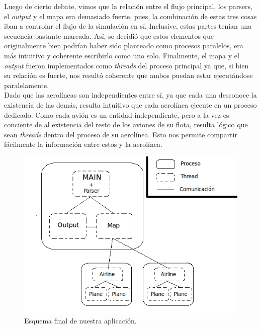 \documentclass[a4paper,10pt]{article}
\begin{document}
 Luego de cierto debate, vimos que la relación entre el flujo principal, los parsers, el \textit{output} y el mapa era demasiado fuerte, pues, 
 la combinación de estas tres cosas iban a controlar el flujo de la simulación en sí. Inclusive, estas partes tenían una secuencia bastante marcada. Así, se 
decidió que estos elementos que originalmente bien podrían haber sido planteado como procesos paralelos, era más intuitivo y coherente escribirlo como uno solo.
 Finalmente, el mapa y el \textit{output} fueron implementados como \textit{threads} del proceso principal ya que, si bien su relación es fuerte, nos resultó 
coherente que ambos puedan estar ejecutándose paralelamente.\\

Dado que las aerolíneas son independientes entre sí, ya que cada una desconoce la existencia de las demás, resulta intuitivo que cada aerolínea ejecute en un 
proceso dedicado. Como cada avión es un entidad independiente, pero a la vez es conciente de al existencia del resto de los aviones de su flota, resulta lógico 
que sean \textit{threads} dentro del proceso de su aerolínea. Esto nos permite compartir fácilmente la información entre estos y la aerolínea.

\begin{figure}[H]
\begin{center}
 \includegraphics[scale=0.6]{./images/Diagrama_simulacion_1.png}
 \caption{Esquema final de nuestra aplicación.}
\end{center}
\end{figure}
\end{document}
